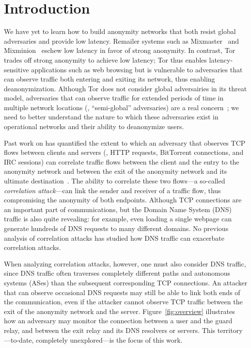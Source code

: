 \section{Introduction}
\label{sec:introduction}

We have yet to learn how to build anonymity networks that both
resist global adversaries and provide low latency.  Remailer systems
such as Mixmaster~\cite{mixmaster} and
Mixminion~\cite{danezis2003mixminion} eschew low latency in favor of
strong anonymity. 
In contrast, Tor~\cite{dingledine04tor} trades off strong anonymity to
achieve low latency; Tor thus  
enables latency-sensitive applications such as web browsing but is
vulnerable to
adversaries that can observe traffic both
entering and exiting its network, thus enabling deanonymization.
Although Tor does not consider global adversairies in its threat model,
adversaries that can observe traffic for extended periods of time in
multiple network locations (\ie, ``semi-global'' adversaries) are a real
concern~\cite{Farrell2014a,Johnson2013a}; we need to better understand
the nature to which these adversaries exist in operational networks and
their ability to deanonymize users.  

Past work on has quantified the extent to which an adversary that
observes TCP flows between clients and servers (\eg, HTTP requests,
BitTorrent connections, and IRC sessions) can correlate traffic flows
between the client and the entry to the anonymity network and between
the exit of the anonymity network and its ultimate
destination~\cite{Johnson2013a,Murdoch2007a}. The ability to correlate
these two flows---a so-called {\em correlation attack}---can link the
sender and receiver of a traffic flow, thus compromising the anonymity
of both endpoints. Although TCP connections are an important part
of communications, but the Domain Name System (DNS) traffic is also
quite revealing: for example, even loading a single webpage can generate
hundreds of DNS requests to many different domains. No previous analysis
of correlation attacks has studied how DNS traffic can exacerbate
correlation attacks. 

When analyzing correlation attacks, however, one must also consider DNS
traffic, since DNS traffic often traverses completely different paths
and autonomous systems (ASes) than the subsequent corresponding TCP
connections.  An attacker that can observe occasional DNS
requests may still be able to link both ends of the communication, even
if the attacker cannot observe TCP traffic between the exit of the
anonymity network and the server.
Figure~\ref{fig:overview} illustrates how an adversary may
monitor the connection between a user and the guard relay, and between the exit
relay and its DNS resolvers or servers.  This 
territory---to-date, completely unexplored---is the focus of this work.

